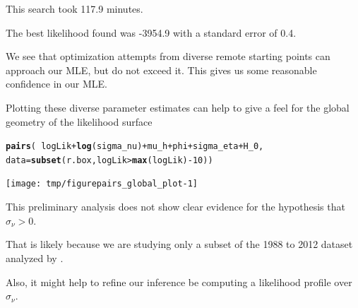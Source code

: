 \documentclass{beamer}\usepackage[]{graphicx}\usepackage[]{color}
\makeatletter
\newcommand{\hlnum}[1]{\textcolor[rgb]{0.686,0.059,0.569}{#1}}%
\newcommand{\hlopt}[1]{\textcolor[rgb]{0,0,0}{#1}}%
\newcommand{\hlstd}[1]{\textcolor[rgb]{0.345,0.345,0.345}{#1}}%
\newcommand{\hlkwc}[1]{\textcolor[rgb]{0.333,0.667,0.333}{#1}}%
\newcommand{\hlkwd}[1]{\textcolor[rgb]{0.737,0.353,0.396}{\textbf{#1}}}%
\newenvironment{kframe}{%
 \def\at@end@of@kframe{}%
 \ifinner\ifhmode%
  \def\at@end@of@kframe{\end{minipage}}%
  \begin{minipage}{\columnwidth}%
 \fi\fi%
 \def\FrameCommand##1{\hskip\@totalleftmargin \hskip-\fboxsep
 \colorbox{shadecolor}{##1}\hskip-\fboxsep
     \hskip-\linewidth \hskip-\@totalleftmargin \hskip\columnwidth}%
 \MakeFramed {\advance\hsize-\width
   \@totalleftmargin\z@ \linewidth\hsize
   \@setminipage}}%
 {\par\unskip\endMakeFramed%
 \at@end@of@kframe}
\newenvironment{knitrout}{}{} %
\makeatother
\begin{document}
\begin{frame}[fragile]

\bi

\item This search took  117.9 minutes. 

\item The best likelihood found was -3954.9 with a standard error of 0.4. 

\item We see that optimization attempts from diverse remote starting points can approach our MLE, but do not exceed it. This gives us some reasonable confidence in our MLE. 

\item Plotting these diverse parameter estimates can help to give a feel for the global geometry of the likelihood surface 

\ei

\end{frame}

\begin{frame}[fragile]

\begin{knitrout}\small
{}\color{fgcolor}\begin{kframe}
\begin{alltt}
\hlkwd{pairs}\hlstd{(}\hlopt{~}\hlstd{logLik}\hlopt{+}\hlkwd{log}\hlstd{(sigma_nu)}\hlopt{+}\hlstd{mu_h}\hlopt{+}\hlstd{phi}\hlopt{+}\hlstd{sigma_eta}\hlopt{+}\hlstd{H_0,}
  \hlkwc{data}\hlstd{=}\hlkwd{subset}\hlstd{(r.box,logLik}\hlopt{>}\hlkwd{max}\hlstd{(logLik)}\hlopt{-}\hlnum{10}\hlstd{))}
\end{alltt}
\end{kframe}
\end{knitrout}

\vspace{-4mm}

\begin{knitrout}\small
{}\color{fgcolor}

{\centering \texttt{[image: tmp/figurepairs\_global\_plot-1]} 

}



\end{knitrout}
\end{frame}

\begin{frame}[fragile]

\bi

\item This preliminary analysis does not show clear evidence for the hypothesis that $\sigma_\nu > 0$. 

\item That is likely because we are studying only a subset of the 1988 to 2012 dataset analyzed by \citet{breto14}. 

\item Also, it might help to refine our inference be computing a likelihood profile over $\sigma_\nu$.

\ei

\end{frame}
\end{document}
